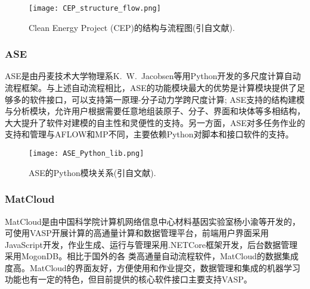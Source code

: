 \begin{figure}[h!]
\centering
\texttt{[image: CEP\_structure\_flow.png]}%
\caption{\textrm{Clean Energy Project (CEP)}的结构与流程图(引自文献).}
\label{Auto_Flow_Platform-4}
\end{figure}

\subsubsection{\rm{ASE}}
\textrm{ASE}是由丹麦技术大学物理系\textrm{K.~W.~Jacobsen}等用\textrm{Python}开发的多尺度计算自动流程框架。与上述自动流程相比，\textrm{ASE}的功能模块最大的优势是计算模块提供了足够多的软件接口，可以支持第一原理-分子动力学跨尺度计算; \textrm{ASE}支持的结构建模与分析模块，允许用户根据需要任意地组装原子、分子、界面和块体等多相结构，大大提升了软件对建模的自主性和灵便性的支持。另一方面，\textrm{ASE}对多任务作业的支持和管理与\textrm{AFLOW}和\textrm{MP}不同，主要依赖\textrm{Python}对脚本和接口软件的支持。
\begin{figure}[h!]
\centering
\texttt{[image: ASE\_Python\_lib.png]}%
\caption{\textrm{ASE}的\textrm{Python}模块关系(引自文献).}
\label{Auto_Flow_Platform-5}
\end{figure}

\subsubsection{\rm{MatCloud}}
\textrm{MatCloud}是由中国科学院计算机网络信息中心材料基因实验室杨小渝等开发的，可使用\textrm{VASP}开展计算的高通量计算和数据管理平台，前端用户界面采用\textrm{JavaScript}开发，作业生成、运行与管理采用\textrm{.NETCore}框架开发，后台数据管理采用\textrm{MogonDB}。相比于国外的各 类高通量自动流程软件，\textrm{MatCloud}的数据集成度高。\textrm{MatCloud}的界面友好，方便使用和作业提交，数据管理和集成的机器学习功能也有一定的特色，但目前提供的核心软件接口主要支持\textrm{VASP}。

